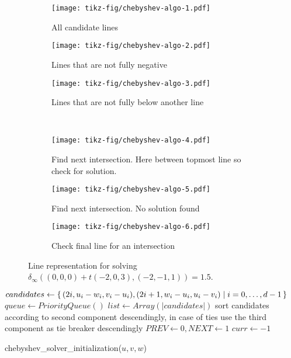 \begin{figure}
  \centering
  \begin{subfigure}[t]{0.3\textwidth}
		\texttt{[image: tikz-fig/chebyshev-algo-1.pdf]}
    \caption{All candidate lines}
  \end{subfigure}
  \begin{subfigure}[t]{0.3\textwidth}
    \texttt{[image: tikz-fig/chebyshev-algo-2.pdf]}
    \caption{Lines that are not fully negative}
  \end{subfigure}
  \begin{subfigure}[t]{0.3\textwidth}
    \texttt{[image: tikz-fig/chebyshev-algo-3.pdf]}
    \caption{Lines that are not fully below another line}
  \end{subfigure}\\
  \begin{subfigure}[t]{0.3\textwidth}
    \texttt{[image: tikz-fig/chebyshev-algo-4.pdf]}
    \caption{Find next intersection. Here between topmost line so check for solution.}
  \end{subfigure}
  \begin{subfigure}[t]{0.3\textwidth}
    \texttt{[image: tikz-fig/chebyshev-algo-5.pdf]}
    \caption{Find next intersection. No solution found}
  \end{subfigure}
  \begin{subfigure}[t]{0.3\textwidth}
    \texttt{[image: tikz-fig/chebyshev-algo-6.pdf]}
    \caption{Check final line for an intersection}
  \end{subfigure}
  \caption{Line representation for solving \(\delta_\infty((0,0,0) + t(-2,0,3), (-2,-1,1)) = 1.5\).}
  \label{fig:chebyshev_algo}
\end{figure}

\begin{algorithm}[ht]
  \DontPrintSemicolon
  \BlankLine
  \(candidates \gets \set{(2i, u_i - w_i, v_i - u_i), (2i+1, w_i - u_i, u_i - v_i) | i = 0, \dots, d - 1}\) \;
  \(queue \gets PriorityQueue()\) \;
  \(list \gets Array(|candidates|)\) \;
  sort candidates according to second component descendingly,
  in case of ties use the third component as tie breaker descendingly \;
  \(PREV \gets 0, NEXT \gets 1\) 
  \(curr \gets -1\) \;

  \caption{chebyshev\_solver\_initialization(\(u, v, w\))}
  \label{algo:solve_chebyshev_init}
\end{algorithm}

